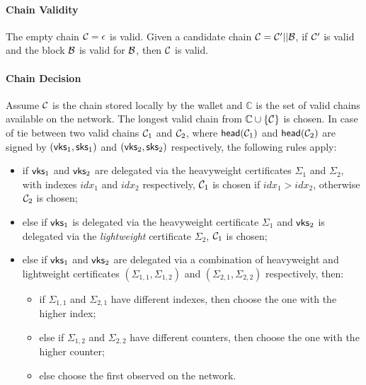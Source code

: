 \paragraph{Chain Validity}
The empty chain $\mathcal{C} = \epsilon$ is valid. Given a candidate chain $\mathcal{C} =
\mathcal{C}' || \mathcal{B}$, if $\mathcal{C}'$ is valid and the block $\mathcal{B}$ is valid for
$\mathcal{B}$, then $\mathcal{C}$ is valid.

\paragraph{Chain Decision}
Assume $\mathcal{C}$ is the chain stored locally by the wallet and $\mathbb{C}$ is
the set of valid chains available on the network. The longest valid chain from
$\mathbb{C} \cup \{ \mathcal{C} \}$ is chosen. In case of tie between two valid
chains $\mathcal{C}_1$ and $\mathcal{C}_2$, where $\mathsf{head}(\mathcal{C}_1)$ and $\mathsf{head}(\mathcal{C}_2)$
are signed by $(\mathsf{vks}_1, \mathsf{sks}_1)$ and
$(\mathsf{vks}_2, \mathsf{sks}_2)$ respectively, the following rules
apply:
\begin{itemize}
    \item if $\mathsf{vks}_1$ and $\mathsf{vks}_2$ are delegated via
        the heavyweight certificates $\Sigma_1$ and $\Sigma_2$, with indexes
        $idx_1$ and $idx_2$ respectively, $\mathcal{C}_1$ is chosen if $idx_1 >
        idx_2$, otherwise $\mathcal{C}_2$ is chosen;
    \item else if $\mathsf{vks}_1$ is delegated via the heavyweight
        certificate $\Sigma_1$ and $\mathsf{vks}_2$ is delegated via the
        \emph{lightweight} certificate $\Sigma_2$, $\mathcal{C}_1$ is chosen;
    \item else if $\mathsf{vks}_1$ and $\mathsf{vks}_2$ are delegated
        via a combination of heavyweight and lightweight certificates
        $(\Sigma_{1,1}, \Sigma_{1,2})$ and $(\Sigma_{2,1}, \Sigma_{2,2})$
        respectively, then:
        \begin{itemize}
            \item if $\Sigma_{1,1}$ and $\Sigma_{2,1}$ have different indexes,
                then choose the one with the higher index;
            \item else if $\Sigma_{1,2}$ and $\Sigma_{2,2}$ have different
                counters, then choose the one with the higher counter;
            \item else choose the first observed on the network.
        \end{itemize}
\end{itemize}

